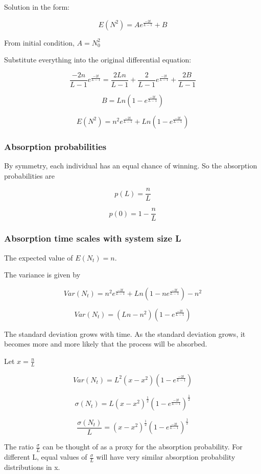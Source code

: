 \documentclass{article}
\begin{document}
Solution in the form:

$$E(N^2) = Ae^{\frac{-2t}{L-1}} + B$$

From initial condition, $A=N_0^2$

Substitute everything into the original differential equation:

$$\frac{-2n}{L-1}e^{\frac{-2t}{L-1}} = \frac{2Ln}{L-1} + \frac{2}{L-1}e^{\frac{-2t}{L-1}} + \frac{2B}{L-1}$$

$$B = Ln(1-e^{\frac{-2t}{L-1}})$$

$$E(N^2) = n^2e^{\frac{-2t}{L-1}} + Ln(1-e^{\frac{-2t}{L-1}})$$



\subsubsection{Absorption probabilities}

By symmetry, each individual has an equal chance of winning. So the absorption probabilities are

$$p(L) = \frac{n}{L}$$

$$p(0) = 1 - \frac{n}{L}$$



\subsubsection{Absorption time scales with system size L}

The expected value of $E(N_t)=n$.

The variance is given by 

$$Var(N_t) = n^2e^{\frac{-2t}{L-1}} + Ln(1-ne^{\frac{-2t}{L-1}}) - n^2$$

$$Var(N_t) = (Ln - n^2)(1- e^{\frac{-2t}{L-1}})$$

The standard deviation grows with time. As the standard deviation grows, it becomes more and more likely that the process will be absorbed. 

Let $x = \frac{n}{L}$

$$Var(N_t) = L^2 (x -x^2)(1- e^{\frac{-2t}{L-1}})$$

$$\sigma(N_t) = L (x -x^2)^{\frac{1}{2}}(1- e^{\frac{-2t}{L-1}})^{\frac{1}{2}}$$

$$\frac{\sigma(N_t)}{L} = (x -x^2)^{\frac{1}{2}}(1- e^{\frac{-2t}{L-1}})^{\frac{1}{2}}$$

The ratio $\frac{\sigma}{L}$ can be thought of as a proxy for the absorption probability. For different L, equal values of $\frac{\sigma}{L}$ will have very similar absorption probability distributions in x. 
\end{document}
